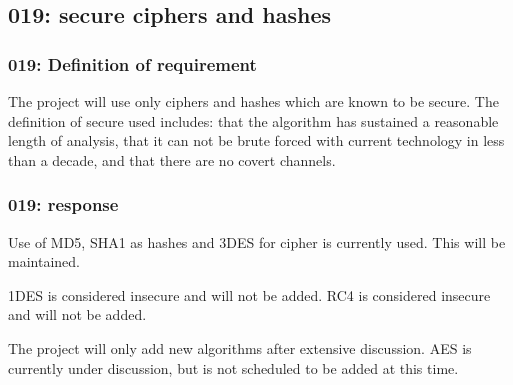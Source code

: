 \subsection{019: secure ciphers and hashes}

\subsubsection{019: Definition of requirement }

The project will use only ciphers and hashes which are known to be secure.
The definition of secure used includes: that the algorithm has sustained a reasonable
length of analysis, that it can not be brute forced with current technology
in less than a decade, and that there are no covert channels.

\subsubsection{019: response}

Use of MD5, SHA1 as hashes and 3DES for cipher is currently used.
This will be maintained.

1DES is considered insecure and will not be added.
RC4 is considered insecure and will not be added.

The project will only add new algorithms after extensive discussion.
AES is currently under discussion, but is not scheduled to be added at this
time.




